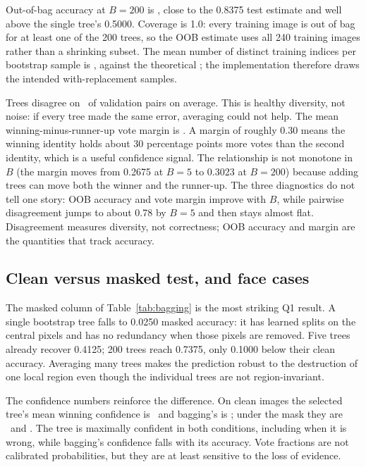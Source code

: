 \documentclass[10pt,twocolumn,letterpaper]{article}
\begin{document}
Out-of-bag accuracy at $B=200$ is \BagOOB, close to the 0.8375 test estimate and
well above the single tree's 0.5000.  Coverage is 1.0: every training image is
out of bag for at least one of the 200 trees, so the OOB estimate uses all 240
training images rather than a shrinking subset.  The mean number of distinct
training indices per bootstrap sample is \BagDistinct, against the theoretical
\BagDistinctTheory; the implementation therefore draws the intended
with-replacement samples.

Trees disagree on \BagDis~of validation pairs on average.  This is healthy
diversity, not noise: if every tree made the same error, averaging could not
help.  The mean winning-minus-runner-up vote margin is \BagMargin.  A margin of
roughly 0.30 means the winning identity holds about 30 percentage points more
votes than the second identity, which is a useful confidence signal.  The
relationship is not monotone in $B$ (the margin moves from 0.2675 at $B=5$ to
0.3023 at $B=200$) because adding trees can move both the winner and the
runner-up.  The three diagnostics do not tell one story: OOB accuracy and vote
margin improve with $B$, while pairwise disagreement jumps to about 0.78 by
$B=5$ and then stays almost flat.  Disagreement measures diversity, not
correctness; OOB accuracy and margin are the quantities that track accuracy.

\subsection{Clean versus masked test, and face cases}

The masked column of Table~\ref{tab:bagging} is the most striking Q1 result.  A
single bootstrap tree falls to 0.0250 masked accuracy: it has learned splits on
the central pixels and has no redundancy when those pixels are removed.  Five
trees already recover 0.4125; 200 trees reach 0.7375, only 0.1000 below their
clean accuracy.  Averaging many trees makes the prediction robust to the
destruction of one local region even though the individual trees are not
region-invariant.

The confidence numbers reinforce the difference.  On clean images the selected
tree's mean winning confidence is \TreeCleanConf~and bagging's is
\BagCleanConf; under the mask they are \TreeMaskConf~and \BagMaskConf.  The tree
is maximally confident in both conditions, including when it is wrong, while
bagging's confidence falls with its accuracy.  Vote fractions are not calibrated
probabilities, but they are at least sensitive to the loss of evidence.
\end{document}
